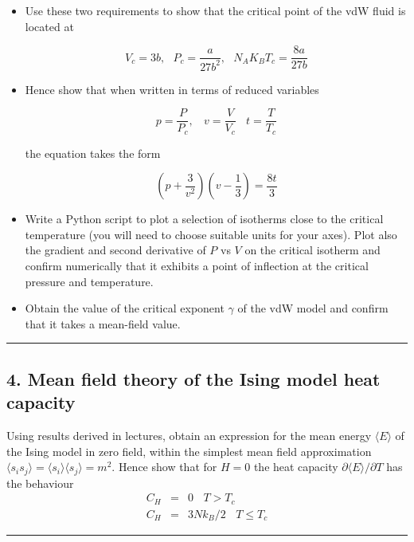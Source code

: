 \documentclass[
  letterpaper,
  enabledeprecatedfontcommands]{report}
\begin{document}
\begin{itemize}
\item
  Use these two requirements to show that the critical point of the vdW
  fluid is located at

  \[V_c=3b, ~~~ P_c=\frac{a}{27b^2},~~~ N_AK_BT_c=\frac{8a}{27b}\]
\item
  Hence show that when written in terms of reduced variables

  \[p=\frac{P}{P_c}, ~~~~ v=\frac{V}{V_c} ~~~~ t=\frac{T}{T_c}\]

  the equation takes the form

  \[\left(p+\frac{3}{v^2}\right)(v-\frac{1}{3})=\frac{8t}{3}\]
\item
  Write a Python script to plot a selection of isotherms close to the
  critical temperature (you will need to choose suitable units for your
  axes). Plot also the gradient and second derivative of \(P\) vs \(V\)
  on the critical isotherm and confirm numerically that it exhibits a
  point of inflection at the critical pressure and temperature.
\item
  Obtain the value of the critical exponent \(\gamma\) of the vdW model
  and confirm that it takes a mean-field value.
\end{itemize}

\begin{center}\rule{0.5\linewidth}{0.5pt}\end{center}

\subsection*{4. Mean field theory of the Ising model heat
capacity}\label{mean-field-theory-of-the-ising-model-heat-capacity}

Using results derived in lectures, obtain an expression for the mean
energy \(\langle E\rangle\) of the Ising model in zero field, within the
simplest mean field approximation \(\langle
  s_is_j\rangle=\langle s_i\rangle\langle s_j\rangle=m^2\). Hence show
that for \(H=0\) the heat capacity \(\partial \langle
  E\rangle/\partial T\) has the behaviour \[
\begin{eqnarray*}
C_H&=& 0 ~~~~ T>T_c\\
C_H&=& 3Nk_B/2 ~~~~ T\le T_c
\end{eqnarray*}
\]

\begin{center}\rule{0.5\linewidth}{0.5pt}\end{center}
\end{document}
